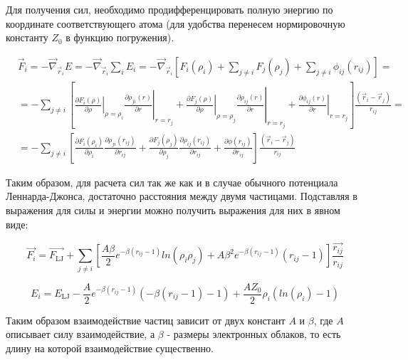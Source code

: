 \documentclass[12pt]{article}
\begin{document}
Для получения сил, необходимо продифференцировать полную энергию по координате соответствующего атома (для удобства перенесем нормировочную константу $Z_0$ в функцию погружения).

\begin{equation}
\begin{aligned}
&\vec{F}_{i}=-\vec{\nabla}_{\vec{r}_{i}} E =
-\vec{\nabla}_{\vec{r}_{i}} \sum_{i} E_i =
-\vec{\nabla}_{\vec{r}_{i}} \left[F_i \left(\rho_{i} \right)+\sum_{j \neq i} F_{j}\left(\rho_{j} \right) + \sum_{j \neq i} \phi_{ij} \left(r_{ij}\right)\right]=\\
&=-\sum_{j \neq i}\left[\left.\left.\frac{\partial F_{i}(\rho)}{\partial \rho}\right|_{\rho=\rho_{i}}\frac{\partial \rho_{ji}(r)}{\partial r}\right|_{r=r_{j}}+
\left.\left.\frac{\partial F_{j}(\rho)}{\partial \rho}\right|_{\rho=\rho_{j}} \frac{\partial \rho_{ij}(r)}{\partial r}\right|_{r=r_{j}}+
\left.\frac{\partial \phi_{i j}(r)}{\partial r}\right|_{r=r_{j}}\right] \frac{\left(\vec{r}_{i}-\vec{r}_{j}\right)}{r_{i j}}= \\
&=-\sum_{j \neq i}\left[\frac{\partial F_{i}(\rho_i)}{\partial \rho_i}\frac{\partial \rho_{ji}(r_{ij})}{\partial r_{ij}}+
\frac{\partial F_{j}(\rho_j)}{\partial \rho_j}\frac{\partial \rho_{ij}(r_{ij})}{\partial r_{ij}}+
\frac{\partial \phi(r_{i j})}{\partial r_{ij}}\right] \frac{\left(\vec{r}_{i}-\vec{r}_{j}\right)}{r_{i j}}
\end{aligned}
\end{equation}

Таким образом, для расчета сил так же как и в случае обычного потенциала Леннарда-Джонса, достаточно расстояния между двумя частицами. Подставляя в выражения для силы и энергии можно получить выражения для них в явном виде:

\begin{equation}
\vec{F_{i}} = \vec{F_{\mathrm{LJ}}} + \sum_{j \neq i} \left[\frac{A\beta}{2} e^{-\beta (r_{ij}-1)} ln\left(\rho_i \rho_j\right) + A \beta^2 e^{-\beta (r_{ij}-1)} (r_{ij}-1) \right] \frac{\vec{r_{ij}}}{r_{ij}}
\end{equation}

\begin{equation}
E_{i} = E_{\mathrm{LJ}} - \frac{A}{2} e^{-\beta (r_{ij}-1)} (-\beta (r_{ij}-1) - 1) + \frac{A Z_0}{2} \rho_i (ln(\rho_i)-1)
\end{equation}

Таким образом взаимодействие частиц зависит от двух констант $A$ и $\beta$, где $A$ описывает силу взаимодействие, а $\beta$ - размеры электронных облаков, то есть длину на которой взаимодействие существенно.
\end{document}
